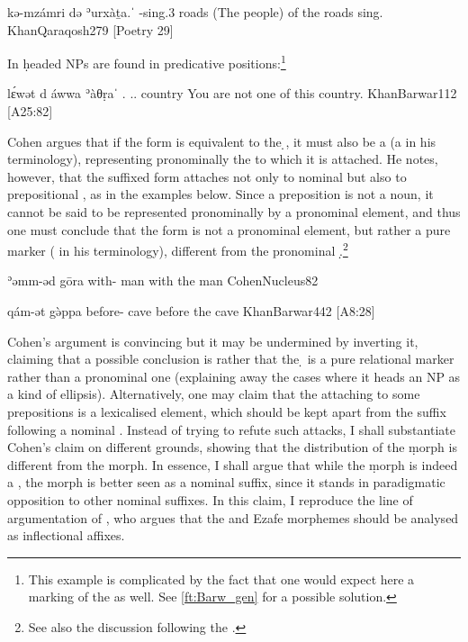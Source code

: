 {kə-mzámri də\cb{} ʾurxàṯa.ˈ}
{\ind-sing.3\pl{} \lnk\cb{} roads}
{(The people) of the roads sing.}
{KhanQaraqosh}{279 {[Poetry 29]}}

In \Barw \d headed NPs are found in predicative positions:\footnote{This example is complicated by the fact that one would expect here a \gen* marking of the \dem* as well.  See \vref{ft:Barw_gen} for a possible solution.}

{lɛ́wət d\cb{} áwwa ʾàθṛaˈ}
{\neg.\masc{} \lnk\cb{} \dem.\near.\masc{} country}
{You are not one of this country.}
{KhanBarwar}{112 {[A25:82]}}


Cohen argues that if  the \ed form is equivalent to the \d {}, it must also be a  (a  in his terminology), representing pronominally the \prim to which it is attached.   He notes, however, that the suffixed form \ed attaches not only to nominal \prims but also to prepositional  \prims, as in the examples below.  Since a preposition is not a noun, it cannot be said to be represented pronominally by a pronominal element, and thus one must conclude that the \ed form is not a pronominal element, but rather a pure \prim marker ( in his terminology), different from the pronominal  \d.\footnote{See also the discussion following the \Syr {}.}  


{ʾəmm-əd gōra}
{with-\cst{} man}
{with the man}
{CohenNucleus}{82}

{qám-ət gə̀ppa}
{before-\cst{} cave}
{before the cave}
{KhanBarwar}{442 {[A8:28]}}

\largerpage
Cohen's argument is convincing but it may be undermined by inverting it, claiming that a possible conclusion is rather that the \d {} is a pure relational marker rather than a pronominal one (explaining away the cases where it heads an NP as a kind of \prim ellipsis). Alternatively, one may claim that the \ed  attaching to some prepositions is a lexicalised element, which should be kept apart from the \ed suffix following a nominal \prim. Instead of trying to refute such attacks, I shall substantiate Cohen's claim on different grounds, showing that the distribution of the \d morph is different from the \ed morph. In essence, I shall argue that while the \d morph is indeed a , the \ed morph is better seen as a nominal suffix, since it stands in paradigmatic opposition to other nominal suffixes. In this claim, I reproduce the line of argumentation of \citet{SamvelianHead, SamvelianEzafe}, who argues that the  and \Kur Ezafe morphemes should be analysed as inflectional affixes. 

